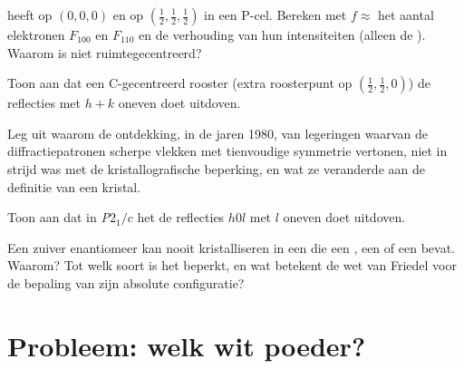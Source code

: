 \begin{exercise}[$\star\star$]\label{exo:b3:x-ray-diffraction:8}
 heeft  op $(0,0,0)$ en  op $(\frac12,\frac12,\frac12)$ in een P-cel. Bereken met $f
\approx$ het aantal elektronen $F_{100}$ en $F_{110}$ en de verhouding van
hun intensiteiten (alleen de ). Waarom is  niet
ruimtegecentreerd?
\end{exercise}

\begin{exercise}[$\star\star$]\label{exo:b3:x-ray-diffraction:9}
Toon aan dat een C-gecentreerd rooster (extra roosterpunt op $(\frac12,\frac12,0)$) de
reflecties met $h + k$ oneven doet uitdoven.
\end{exercise}

\begin{exercise}[$\star\star\star$]\label{exo:b3:x-ray-diffraction:10}
Leg uit waarom de ontdekking, in de jaren 1980, van legeringen waarvan de
diffractiepatronen scherpe vlekken met tienvoudige symmetrie vertonen, niet
in strijd was met de kristallografische beperking, en wat ze veranderde
aan de definitie van een kristal.
\end{exercise}

\begin{exercise}[$\star\star\star$]\label{exo:b3:x-ray-diffraction:11}
Toon aan dat in \textit{P}$2_1/c$ het  de reflecties $h0l$ met $l$
oneven doet uitdoven.
\end{exercise}

\begin{exercise}[$\star\star\star$]\label{exo:b3:x-ray-diffraction:12}
Een zuiver enantiomeer kan nooit kristalliseren in een  die een
, een  of een  bevat. Waarom? Tot
welk soort  is het beperkt, en wat betekent de wet van
Friedel voor de bepaling van zijn absolute configuratie?
\end{exercise}

\clearpage
\enlargethispage{3\baselineskip}
\section{Probleem: welk wit poeder?}

